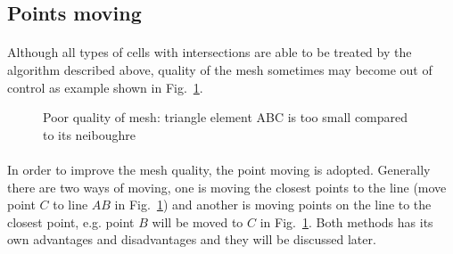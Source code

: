 \subsection{Points moving}
\label{qdt_sc:point_moving}
\paragraph{}
Although all types of cells with intersections are able to be treated by the algorithm described above, quality of the mesh sometimes may become out of control as example shown in Fig.~\ref{qdt_fig:qdt_cutting_poor_mesh_quality}.
    \begin{figure}[h!]
        \centering
        \caption[Poor quality of mesh]{Poor quality of mesh: triangle element ABC is too small compared to its neiboughre}
        \label{qdt_fig:qdt_cutting_poor_mesh_quality}
    \end{figure}
\paragraph{}
In order to improve the mesh quality, the point moving is adopted.
Generally there are two ways of moving, one is moving the closest points to the line (move point $C$ to line $AB$ in Fig.~\ref{qdt_fig:qdt_cutting_poor_mesh_quality}) and another is moving points on the line to the closest point, e.g. point $B$ will be moved to $C$ in Fig.~\ref{qdt_fig:qdt_cutting_poor_mesh_quality}.
Both methods has its own advantages and disadvantages and they will be discussed later.

